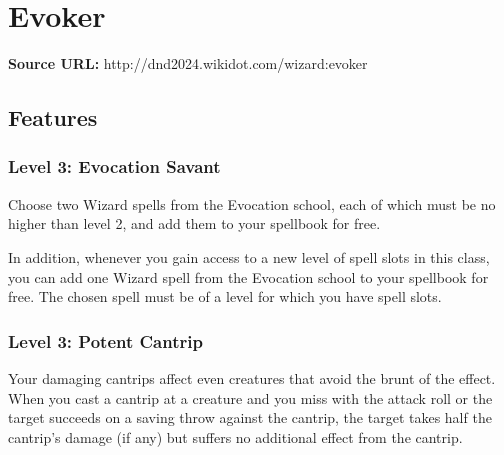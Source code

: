 \documentclass{article}
\begin{document}

\section*{ Evoker }

\textbf{Source URL:} http://dnd2024.wikidot.com/wizard:evoker

\vspace{1em}







\subsection*{Features}

\subsubsection*{ Level 3: Evocation Savant }

Choose two Wizard spells from the Evocation school, each of which must be no higher than level 2, and add them to your spellbook for free.

In addition, whenever you gain access to a new level of spell slots in this class, you can add one Wizard spell from the Evocation school to your spellbook for free. The chosen spell must be of a level for which you have spell slots.

\vspace{1em}

\subsubsection*{ Level 3: Potent Cantrip }

Your damaging cantrips affect even creatures that avoid the brunt of the effect. When you cast a cantrip at a creature and you miss with the attack roll or the target succeeds on a saving throw against the cantrip, the target takes half the cantrip’s damage (if any) but suffers no additional effect from the cantrip.
\end{document}
